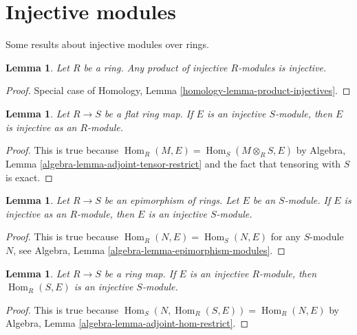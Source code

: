 \documentclass{stacks-project}
\theoremstyle{plain}
\newtheorem{lemma}[subsection]{Lemma}
\theoremstyle{definition}
\theoremstyle{remark}
\numberwithin{equation}{subsection}
\def\Hom{\mathop{\mathrm{Hom}}\nolimits}
\begin{document}
\section{Injective modules}
\label{section-injective-modules}

\noindent
Some results about injective modules over rings.

\begin{lemma}
\label{lemma-product-injectives}
Let $R$ be a ring. Any product of injective $R$-modules is injective.
\end{lemma}

\begin{proof}
Special case of Homology, Lemma \ref{homology-lemma-product-injectives}.
\end{proof}

\begin{lemma}
\label{lemma-injective-flat}
Let $R \to S$ be a flat ring map. If $E$ is an injective $S$-module,
then $E$ is injective as an $R$-module.
\end{lemma}

\begin{proof}
This is true because $\Hom_R(M, E) = \Hom_S(M \otimes_R S, E)$
by Algebra, Lemma \ref{algebra-lemma-adjoint-tensor-restrict}
and the fact that tensoring with $S$ is exact.
\end{proof}

\begin{lemma}
\label{lemma-injective-epimorphism}
Let $R \to S$ be an epimorphism of rings. Let $E$ be an $S$-module.
If $E$ is injective as an $R$-module, then $E$ is an injective $S$-module.
\end{lemma}

\begin{proof}
This is true because $\Hom_R(N, E) = \Hom_S(N, E)$ for any $S$-module $N$,
see Algebra, Lemma \ref{algebra-lemma-epimorphism-modules}.
\end{proof}

\begin{lemma}
\label{lemma-hom-injective}
Let $R \to S$ be a ring map. If $E$ is an injective $R$-module,
then $\Hom_R(S, E)$ is an injective $S$-module.
\end{lemma}

\begin{proof}
This is true because $\Hom_S(N, \Hom_R(S, E)) = \Hom_R(N, E)$ by
Algebra, Lemma \ref{algebra-lemma-adjoint-hom-restrict}.
\end{proof}
\end{document}
